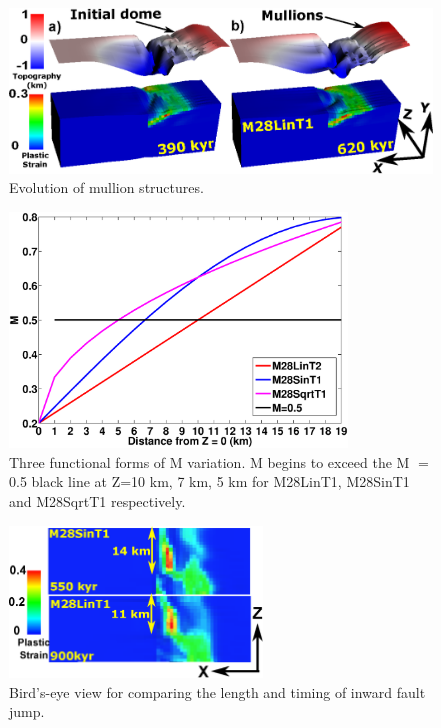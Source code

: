 \documentclass[draft,gc]{agutex}
\begin{document}
\begin{figure}[h]
\noindent\includegraphics[width=1.0\textwidth]{./Figures/fig_Results_3_2_6_mullion_evolution.eps}
  \caption{Evolution of mullion structures.}
 \label{fig_Results_3_2_6_mullion_evolution}
\end{figure}

\begin{figure}[h]
\noindent\includegraphics[width=0.8\textwidth]{./Figures/fig_Results_3_3_M_variation.eps}
  \caption[Three functional forms of M variation.]{Three functional forms of M variation. M begins to exceed the M $=$ 0.5 black line at Z=10 km, 7 km, 5 km for M28LinT1, M28SinT1 and M28SqrtT1 respectively.}
 \label{fig_Results3_1}
\end{figure}   

\begin{figure}[h]
\noindent\includegraphics[width=0.6\textwidth]{./Figures/fig_Results4_2_secondary_fault_length_comparison1.eps}
  \caption{Bird's-eye view for comparing the length and timing of inward fault jump.}
 \label{fig_Results4_2}
\end{figure}   
\end{document}
